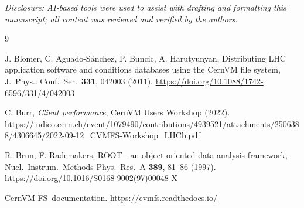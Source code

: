\documentclass{webofc}
\newcommand{\cvmfs}{CernVM-FS}
\begin{document}
\vspace{0.3em}
\noindent\emph{Disclosure: AI-based tools were used to assist with
drafting and formatting this manuscript; all content was reviewed and
verified by the authors.}

\begin{thebibliography}{9}

J. Blomer, C. Aguado-S\'anchez, P. Buncic, A. Harutyunyan,
Distributing LHC application software and conditions databases using
the CernVM file system, J.\ Phys.: Conf.\ Ser.\ \textbf{331}, 042003
(2011). \url{https://doi.org/10.1088/1742-6596/331/4/042003}

C. Burr, \textit{Client performance}, CernVM Users Workshop (2022).
\url{https://indico.cern.ch/event/1079490/contributions/4939521/attachments/2506388/4306645/2022-09-12_CVMFS-Workshop_LHCb.pdf}

R. Brun, F. Rademakers, ROOT---an object oriented data analysis
framework, Nucl.\ Instrum.\ Methods Phys.\ Res.\ A \textbf{389},
81--86 (1997). \url{https://doi.org/10.1016/S0168-9002(97)00048-X}

\cvmfs\ documentation. \url{https://cvmfs.readthedocs.io/}

\end{thebibliography}
\end{document}
